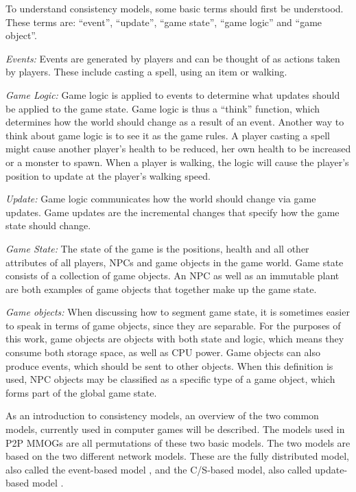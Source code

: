 \documentclass[10pt,a4paper,journal,cspaper,compsoc]{IEEEtran}
\begin{document}
To understand consistency models, some basic terms should first be understood. These terms are: ``event'', ``update'', ``game state'', ``game logic''
and ``game object''.

\emph{Events:} Events are generated by players and can be thought of as actions taken by players. These include casting a spell, using an item
    or walking.

\emph{Game Logic:} Game logic is applied to events to determine what updates should be applied to the game state. Game logic is thus a
    ``think'' function, which determines how the world should change as a result of an event. Another way to think about game logic is to see
    it as the game rules. A player casting a spell might cause another player's health to be reduced, her own health to be increased or a
    monster to spawn. When a player is walking, the logic will cause the player's position to update at the player's walking speed.

\emph{Update:} Game logic communicates how the world should change via game updates. Game updates are the incremental changes that specify how
    the game state should change.

\emph{Game State:} The state of the game is the positions, health and all other attributes of all players, NPCs and game objects in the game
    world. Game state consists of a collection of game objects. An NPC as well as an immutable plant are both examples of game objects that
    together make up the game state.

\emph{Game objects:} When discussing how to segment game state, it is sometimes easier to speak in terms of game objects, since they are
    separable. For the purposes of this work, game objects are objects with both state and logic, which means they consume both storage
    space, as well as CPU power. Game objects can also produce events, which should be sent to other objects. When this definition is used,
    NPC objects may be classified as a specific type of a game object, which forms part of the global game state.

As an introduction to consistency models, an overview of the two common models, currently used in computer games will be described. The models used
in P2P MMOGs are all permutations of these two basic models. The two models are based on the two different network models. These are the fully
distributed model, also called the event-based model \cite{p2p_cm_aoe}, and the C/S-based model, also called update-based model
\cite{unreal_networking}.
\end{document}
